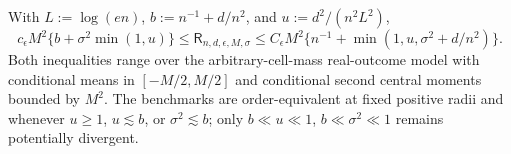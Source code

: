 With \(L:=\log(en)\), \(b:=n^{-1}+d/n^2\), and \(u:=d^2/(n^2L^2)\),
\[
 c_{\epsilon}M^2\{b+\sigma^2\min(1,u)\}
 \le\mathsf R_{n,d,\epsilon,M,\sigma}
 \le C_{\epsilon}M^2\{n^{-1}+\min(1,u,\sigma^2+d/n^2)\}.
\]
Both inequalities range over the arbitrary-cell-mass real-outcome model with conditional means in \([-M/2,M/2]\) and conditional second central moments bounded by \(M^2\).  The benchmarks are order-equivalent at fixed positive radii and whenever \(u\ge1\), \(u\lesssim b\), or \(\sigma^2\lesssim b\); only \(b\ll u\ll1\), \(b\ll\sigma^2\ll1\) remains potentially divergent.